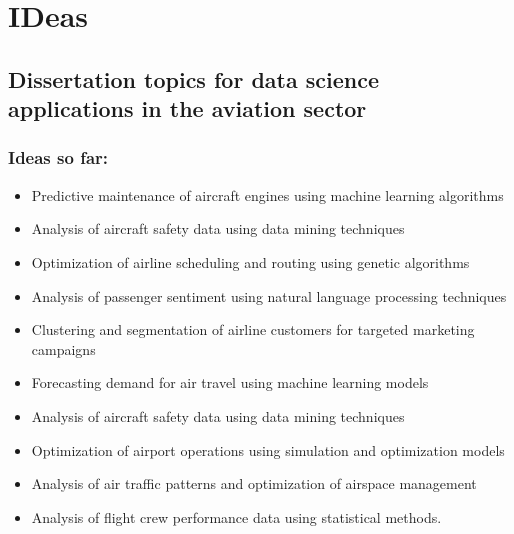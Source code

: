 \chapter{IDeas}

\section{Dissertation topics for data science applications in the aviation sector}

\subsection{Ideas so far:}
\begin{itemize}
    \item Predictive maintenance of aircraft engines using machine learning algorithms
    \item Analysis of aircraft safety data using data mining techniques
    \item Optimization of airline scheduling and routing using genetic algorithms
    \item Analysis of passenger sentiment using natural language processing techniques
    \item Clustering and segmentation of airline customers for targeted marketing campaigns
    \item Forecasting demand for air travel using machine learning models
    \item Analysis of aircraft safety data using data mining techniques
    \item Optimization of airport operations using simulation and optimization models
    \item Analysis of air traffic patterns and optimization of airspace management
    \item Analysis of flight crew performance data using statistical methods.
\end{itemize}

